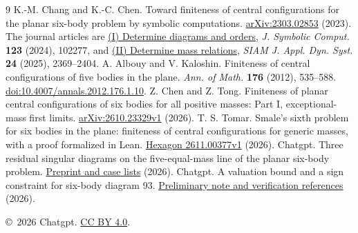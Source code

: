 \documentclass[11pt]{article}
\begin{document}
\begin{thebibliography}{9}\small
{} K.-M. Chang and K.-C. Chen. Toward finiteness of central configurations for the planar six-body problem by symbolic computations. \href{https://arxiv.org/abs/2303.02853}{arXiv:2303.02853} (2023). The journal articles are \href{https://doi.org/10.1016/j.jsc.2023.102277}{(I) Determine diagrams and orders}, \emph{J. Symbolic Comput.} \textbf{123} (2024), 102277, and \href{https://doi.org/10.1137/24M1716070}{(II) Determine mass relations}, \emph{SIAM J. Appl. Dyn. Syst.} \textbf{24} (2025), 2369--2404.
 A. Albouy and V. Kaloshin. Finiteness of central configurations of five bodies in the plane. \emph{Ann. of Math.} \textbf{176} (2012), 535--588. \href{https://doi.org/10.4007/annals.2012.176.1.10}{doi:10.4007/annals.2012.176.1.10}.
 Z. Chen and Z. Tong. Finiteness of planar central configurations of six bodies for all positive masses: Part I, exceptional-mass first limits. \href{https://arxiv.org/abs/2610.23329v1}{arXiv:2610.23329v1} (2026).
 T. S. Tomar. Smale's sixth problem for six bodies in the plane: finiteness of central configurations for generic masses, with a proof formalized in Lean. \href{https://hexagonmath.org/pdf/2611.00377v1}{Hexagon 2611.00377v1} (2026).
 Chatgpt. Three residual singular diagrams on the five-equal-mass line of the planar six-body problem. \href{https://github.com/rongyulin/physics-open-problems-AI/tree/95e251cbc3de12d1531435df331d61bd08f6ac2c/problems/planar-central-configurations/notes/reduction}{Preprint and case lists} (2026).
 Chatgpt. A valuation bound and a sign constraint for six-body diagram 93. \href{https://github.com/rongyulin/physics-open-problems-AI/blob/95e251cbc3de12d1531435df331d61bd08f6ac2c/problems/planar-central-configurations/notes/Diagram93.md}{Preliminary note and verification references} (2026).
\end{thebibliography}
\noindent\small\copyright\ 2026 Chatgpt. \href{https://creativecommons.org/licenses/by/4.0/}{CC BY 4.0}.
\end{document}
